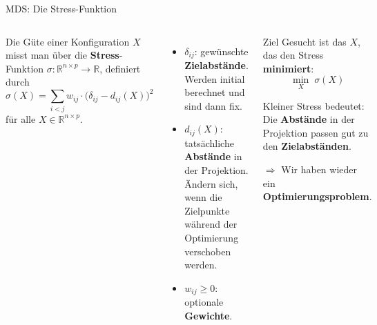 \begin{frame}{MDS: Die Stress-Funktion}
  \small
\begin{columns}
Die Güte einer Konfiguration $X$ misst man über die \textbf{Stress}-Funktion $\sigma: \mathbb{R}^{n\times p} \to \mathbb{R}$, definiert durch 
\[
  \sigma(X) = \sum_{i<j} w_{ij} \cdot \bigl(\delta_{ij} - d_{ij}(X)\bigr)^2
\]
für alle $X\in \mathbb{R}^{n\times p}$. 

\begin{itemize}
  \item $\delta_{ij}$: gewünschte \textbf{Zielabstände}. Werden initial berechnet und sind dann fix.
  \item $d_{ij}(X)$: tatsächliche \textbf{Abstände} in der Projektion. Ändern sich, wenn die Zielpunkte während der Optimierung verschoben werden. 
  \item $w_{ij} \geq 0$: optionale \textbf{Gewichte}.
\end{itemize}



\begin{blockDef}{\small Ziel}
  Gesucht ist das $X$, das den Stress \textbf{minimiert}:
\[ \min_X \; \sigma(X)\]

\medskip
Kleiner Stress bedeutet: Die \textbf{Abstände} in der Projektion passen gut
zu den \textbf{Zielabständen}.

\medskip
$\Rightarrow$ Wir haben wieder ein \textbf{Optimierungsproblem}.
\end{blockDef}
\end{columns}
\end{frame}

